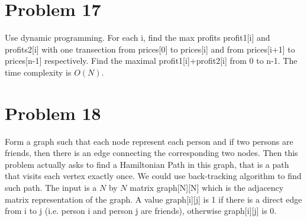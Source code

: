 \documentclass[12pt]{amsart}
\begin{document}
\section{Problem 17}
Use dynamic programming. For each i, find the max profits profit1[i] and profits2[i] with one transection from prices[0] to prices[i] and from prices[i+1] to prices[n-1] respectively. Find the  maximal profit1[i]+profit2[i] from 0 to n-1. The time complexity is $O(N)$.

\begin{framed}

\end{framed}


\section{Problem 18}
Form a graph such that each node represent each person and if two persons are friends, then there is an edge connecting the corresponding two nodes. Then this problem actually asks to find a Hamiltonian Path in this graph, that is a path that visits each vertex exactly once.
We could use back-tracking algorithm to find such path. The input is a $N$ by $N$ matrix graph[N][N] which is the adjacency matrix representation of the graph. A value graph[i][j] is 1 if there is a direct edge from i to j (i.e. person i and person j are friends), otherwise graph[i][j] is 0. 

\begin{framed}

\end{framed}






\end{document}
